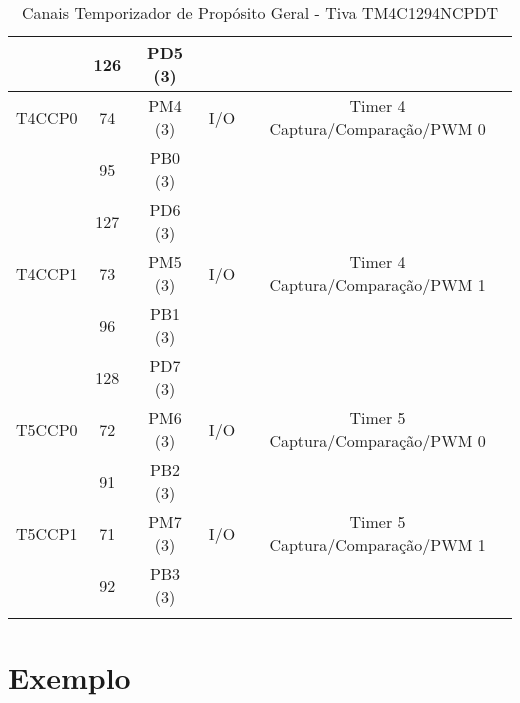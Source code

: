 \begin{center}
\begin{longtable}{|c|c|c|c|c|}
		& 126 & PD5 (3) &     &                                 \\ \hline
		T4CCP0    & 74  & PM4 (3) & I/O & Timer 4 Captura/Comparação/PWM 0\\
		& 95  & PB0 (3) &     &                                 \\ 
		& 127 & PD6 (3) &     &                                 \\ \hline
		T4CCP1    & 73  & PM5 (3) & I/O & Timer 4 Captura/Comparação/PWM 1\\
		& 96  & PB1 (3) &     &                                 \\ 
		& 128 & PD7 (3) &     &                                 \\ \hline
		T5CCP0    & 72  & PM6 (3) & I/O & Timer 5 Captura/Comparação/PWM 0\\
		& 91  & PB2 (3) &     &                                 \\ \hline
		T5CCP1    & 71  & PM7 (3) & I/O & Timer 5 Captura/Comparação/PWM 1\\
		& 92  & PB3 (3) &     &                                 \\ \hline
		\caption{Canais Temporizador de Propósito Geral - Tiva TM4C1294NCPDT \cite{DATASHEET_TIVA} }
		\label{tab:CanaisTimer}
	\end{longtable}
\end{center}



\section{Exemplo}